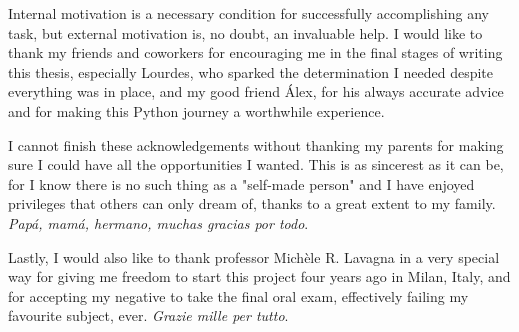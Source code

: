 Internal motivation is a necessary condition for successfully accomplishing any task, but external motivation is, no doubt, an invaluable help. I would like to thank my friends and coworkers for encouraging me in the final stages of writing this thesis, especially Lourdes, who sparked the determination I needed despite everything was in place, and my good friend Álex, for his always accurate advice and for making this Python journey a worthwhile experience.

I cannot finish these acknowledgements without thanking my parents for making sure I could have all the opportunities I wanted. This is as sincerest as it can be, for I know there is no such thing as a "self-made person" and I have enjoyed privileges that others can only dream of, thanks to a great extent to my family. \textit{Papá, mamá, hermano, muchas gracias por todo}.

Lastly, I would also like to thank professor Michèle R. Lavagna in a very special way for giving me freedom to start this project four years ago in Milan, Italy, and for accepting my negative to take the final oral exam, effectively failing my favourite subject, ever. \textit{Grazie mille per tutto}.
